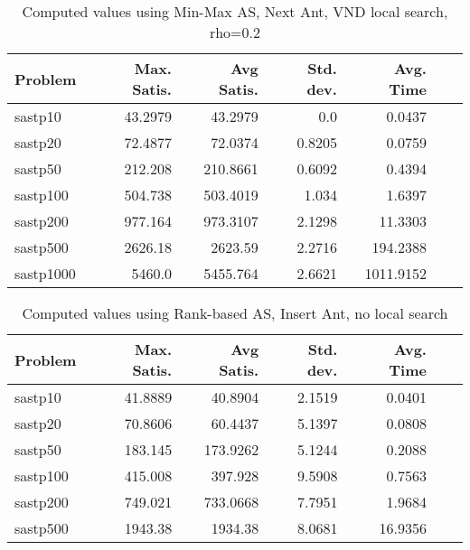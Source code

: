 \documentclass{article}
\begin{document}
\begin{table}[b!]
  \caption{Computed values using Min-Max AS, Next Ant, VND local search, rho=0.2}
  \label{tab:conf8}
  \setlength{\tabcolsep}{1.4mm}
  \centering
  \begin{tabular}{lrrrrrr}
    \bfseries Problem &
    \bfseries Max. Satis. &
    \bfseries Avg Satis. &
    \bfseries Std. dev. &
    \bfseries Avg. Time 
    \\\hline
  sastp10 & 43.2979 & 43.2979 & 0.0 & 0.0437 \\ 
  sastp20 & 72.4877 & 72.0374 & 0.8205 & 0.0759 \\ 
  sastp50 & 212.208 & 210.8661 & 0.6092 & 0.4394 \\ 
  sastp100 & 504.738 & 503.4019 & 1.034 & 1.6397 \\ 
  sastp200 & 977.164 & 973.3107 & 2.1298 & 11.3303 \\ 
  sastp500 & 2626.18 & 2623.59 & 2.2716 & 194.2388 \\ 
  sastp1000 & 5460.0 & 5455.764 & 2.6621 & 1011.9152
    \\\hline
  \end{tabular}

\end{table}

\begin{table}[b!]
  \caption{Computed values using Rank-based AS, Insert Ant, no local search}
  \label{tab:conf9}
  \setlength{\tabcolsep}{1.4mm}
  \centering
  \begin{tabular}{lrrrrrr}
    \bfseries Problem &
    \bfseries Max. Satis. &
    \bfseries Avg Satis. &
    \bfseries Std. dev. &
    \bfseries Avg. Time 
    \\\hline
    sastp10 & 41.8889 & 40.8904 & 2.1519 & 0.0401 \\ 
    sastp20 & 70.8606 & 60.4437 & 5.1397 & 0.0808 \\ 
    sastp50 & 183.145 & 173.9262 & 5.1244 & 0.2088 \\ 
    sastp100 & 415.008 & 397.928 & 9.5908 & 0.7563 \\ 
    sastp200 & 749.021 & 733.0668 & 7.7951 & 1.9684 \\ 
    sastp500 & 1943.38 & 1934.38 & 8.0681 & 16.9356
    \\\hline
  \end{tabular}

\end{table}
\end{document}
